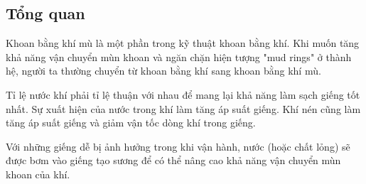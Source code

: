 \documentclass[13pt,a4paper]{article}
\begin{document}
\subsection{Tổng quan}
	Khoan bằng khí mù là một phần trong kỹ thuật khoan bằng khí. Khi muốn tăng khả năng vận chuyển mùn khoan và ngăn chặn hiện tượng "mud rings" ở thành hệ, người ta thường chuyển từ khoan bằng khí sang khoan bằng khí mù.\par
	Tỉ lệ nước khí phải tỉ lệ thuận với nhau để mang lại khả năng làm sạch giếng tốt nhất. Sự xuất hiện của nước trong khí làm tăng áp suất giếng. Khí nén cũng làm tăng áp suất giếng và giảm vận tốc dòng khí trong giếng.\par
	Với những giếng dễ bị ảnh hưởng trong khi vận hành, nước (hoặc chất lỏng) sẽ được bơm vào giếng tạo sương để có thể nâng cao khả năng vận chuyển mùn khoan của khí.
\end{document}
